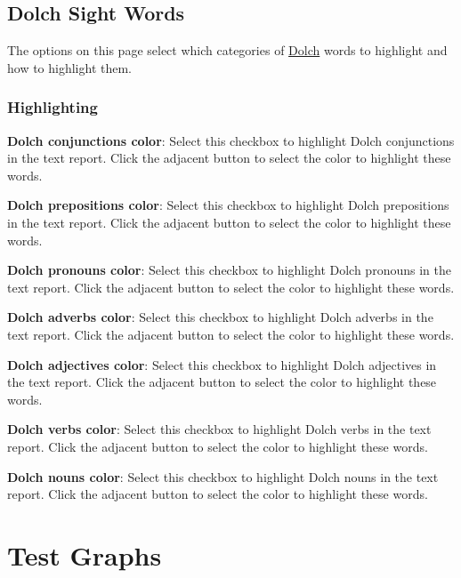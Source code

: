 \documentclass[
]{book}
\theoremstyle{definition}
\theoremstyle{definition}
\theoremstyle{definition}
\theoremstyle{definition}
\theoremstyle{remark}
\begin{document}
\newpage

\hypertarget{dolch-options}{%
\subsection*{Dolch Sight Words}\label{dolch-options}}

The options on this page select which categories of \protect\hyperlink{reviewing-dolch}{Dolch} words to highlight and how to highlight them.

\hypertarget{highlighting-1}{%
\subsubsection*{Highlighting}\label{highlighting-1}}

\textbf{Dolch conjunctions color}: Select this checkbox to highlight Dolch conjunctions in the text report. Click the adjacent button to select the color to highlight these words.

\textbf{Dolch prepositions color}: Select this checkbox to highlight Dolch prepositions in the text report. Click the adjacent button to select the color to highlight these words.

\textbf{Dolch pronouns color}: Select this checkbox to highlight Dolch pronouns in the text report. Click the adjacent button to select the color to highlight these words.

\textbf{Dolch adverbs color}: Select this checkbox to highlight Dolch adverbs in the text report. Click the adjacent button to select the color to highlight these words.

\textbf{Dolch adjectives color}: Select this checkbox to highlight Dolch adjectives in the text report. Click the adjacent button to select the color to highlight these words.

\textbf{Dolch verbs color}: Select this checkbox to highlight Dolch verbs in the text report. Click the adjacent button to select the color to highlight these words.

\textbf{Dolch nouns color}: Select this checkbox to highlight Dolch nouns in the text report. Click the adjacent button to select the color to highlight these words.

\newpage

\hypertarget{options-graphs}{%
\section{Test Graphs}\label{options-graphs}}
\end{document}
